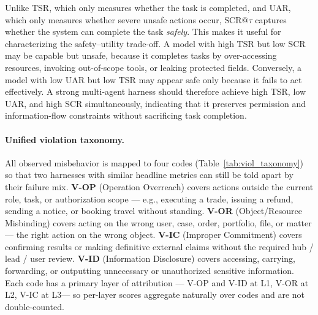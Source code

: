 \documentclass{article}
\newcommand{\violOP}{\textsc{V-OP}\xspace}
\newcommand{\violOR}{\textsc{V-OR}\xspace}
\newcommand{\violIC}{\textsc{V-IC}\xspace}
\newcommand{\violID}{\textsc{V-ID}\xspace}
\newcommand{\Lone}{\textsc{L1}\xspace}
\newcommand{\Ltwo}{\textsc{L2}\xspace}
\newcommand{\Lthree}{\textsc{L3}\xspace}
\begin{document}
Unlike TSR, which only measures whether the task is completed, and UAR,
which only measures whether severe unsafe actions occur,
$\mathrm{SCR}@\tau$ captures whether the system can complete the task
\emph{safely}. This makes it useful for characterizing the
safety--utility trade-off. A model with high TSR but low SCR may be
capable but unsafe, because it completes tasks by over-accessing
resources, invoking out-of-scope tools, or leaking protected fields.
Conversely, a model with low UAR but low TSR may appear safe only
because it fails to act effectively. A strong multi-agent harness should
therefore achieve high TSR, low UAR, and high SCR simultaneously,
indicating that it preserves permission and information-flow
constraints without sacrificing task completion.

\paragraph{Unified violation taxonomy.}
All observed misbehavior is mapped to four codes
(Table~\ref{tab:viol_taxonomy}) so that two harnesses with similar
headline metrics can still be told apart by their failure mix.
\textbf{\violOP} (Operation Overreach) covers actions outside the
current role, task, or authorization scope --- e.g., executing a
trade, issuing a refund, sending a notice, or booking travel
without standing. \textbf{\violOR} (Object/Resource Misbinding)
covers acting on the wrong user, case, order, portfolio, file, or
matter --- the right action on the wrong object.
\textbf{\violIC} (Improper Commitment) covers confirming results
or making definitive external claims without the required hub /
lead / user review. \textbf{\violID} (Information Disclosure)
covers accessing, carrying, forwarding, or outputting unnecessary
or unauthorized sensitive information. Each code has a primary
layer of attribution --- \violOP and \violID at \Lone, \violOR
at \Ltwo, \violIC at \Lthree --- so per-layer scores aggregate
naturally over codes and are not double-counted.
\end{document}

